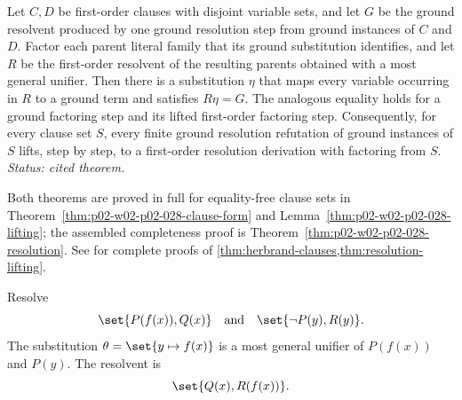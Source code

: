 \begin{theorem}
\label{thm:resolution-lifting}
Let \(C,D\) be first-order clauses with disjoint variable sets, and let \(G\)
be the ground resolvent produced by one ground resolution step from ground
instances of \(C\) and \(D\).  Factor each parent literal family that its
ground substitution identifies, and let \(R\) be the first-order resolvent of
the resulting parents obtained with a most general unifier.  Then there is a
substitution \(\eta\) that maps every variable occurring in \(R\) to a ground
term and satisfies \(R\eta=G\).  The analogous equality holds for a ground
factoring step and its lifted first-order factoring step.  Consequently, for
every clause set \(S\), every
 finite ground resolution refutation of ground instances of \(S\) lifts, step by
step, to a first-order resolution derivation with factoring from \(S\).
\textit{Status: cited theorem.}
\end{theorem}

Both theorems are proved in full for equality-free clause sets in Theorem~\ref{thm:p02-w02-p02-028-clause-form} and Lemma~\ref{thm:p02-w02-p02-028-lifting}; the assembled completeness proof is Theorem~\ref{thm:p02-w02-p02-028-resolution}.
See \cite{Robinson1965,BachmairGanzinger2001} for complete proofs of
\cref{thm:herbrand-clauses,thm:resolution-lifting}.

\begin{example}
Resolve
\[
 \set{P(f(x)),Q(x)}
 \quad\text{and}\quad
 \set{\neg P(y),R(y)}.
\]
The substitution \(\theta=\set{y\mapsto f(x)}\) is a most general unifier of
\(P(f(x))\) and \(P(y)\).  The resolvent is
\[
 \set{Q(x),R(f(x))}.
\]
\end{example}

